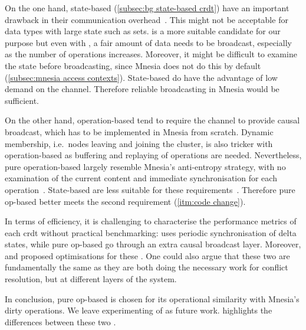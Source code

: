 On the one hand, state-based  (\cref{subsec:bg state-based crdt}) 
have an important drawback in their communication
overhead~\cite{almeida2018DeltaCRDT}. This might not be acceptable for data types 
with large state such as sets.  is a more suitable candidate for our 
purpose but even with , a fair amount
of data needs to be broadcast, especially as the number of operations increases. 
Moreover, it might be difficult to 
examine the state before broadcasting, since Mnesia does not do this by 
default (\cref{subsec:mnesia access contexts}).
State-based  do have the advantage of low demand 
on the channel. Therefore reliable broadcasting in Mnesia would be sufficient.
 

On the other hand, operation-based  tend to require the channel
to provide causal broadcast, which has to be implemented in Mnesia from scratch.
Dynamic membership, i.e.\
nodes leaving and joining the cluster, is also tricker with operation-based
 as buffering and replaying of operations are needed. Nevertheless,
pure operation-based \acrshortpl{crdt} largely resemble Mnesia's anti-entropy strategy,
with no examination of the current content and immediate synchronisation
for each operation~\cite{mattsson2009impltxt}. 
State-based  are less suitable for these requirements~\cite{preguica2018CRDT}. 
Therefore pure op-based \acrshortpl{crdt} better meets the second 
requirement (\cref{itm:code change}).

In terms of efficiency, it is challenging to characterise the performance metrics
of each \acrshort{crdt} without practical benchmarking:
 uses periodic synchronisation of delta states, while
pure op-based \acrshortpl{crdt} go through an extra causal broadcast layer.
Moreover, \citet{almeida2018DeltaCRDT} and \citet{baquero2017PureOp}
proposed optimisations for these . One could
also argue that these two \acrshortpl{crdt} are fundamentally the same as they
are both doing the necessary work for conflict resolution, but at different
layers of the system.

In conclusion, pure op-based  is chosen for its operational
similarity with Mnesia's dirty operations. We leave experimenting of
\acrshortpl{dcrdt} as future work.
 highlights the differences between these 
two \acrshortpl{crdt}.

